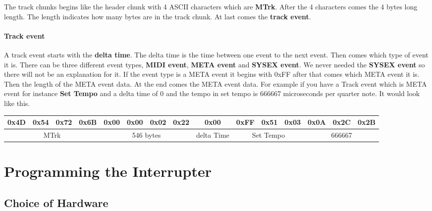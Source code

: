 The track chunks begins like the header chunk with 4 ASCII characters which are \textbf{MTrk}. After the 4 characters comes the 4 bytes long length. The length indicates how many bytes are in the track chunk. At last comes the \textbf{track event}.

\subsubsection{Track event}

A track event starts with the \textbf{delta time}. The delta time is the time between one event to the next event. Then comes which type of event it is. There can be three different event types, \textbf{MIDI event}, \textbf{META event} and \textbf{SYSEX event}. We never needed the \textbf{SYSEX event} so there will not be an explanation for it. If the event type is a META event it begins with 0xFF after that comes which META event it is. Then the length of the META event data. At the end comes the META event data. For example if you have a Track event which is META event for instance \textbf{Set Tempo} and a delta time of 0 and the tempo in set tempo is 666667 microseconds per quarter note. It would look like this.

\begin{table}
\centering
\begin{tabular}{|llll|llll|c|lll|lll|}
0x4D & 0x54 & 0x72 & 0x6B    & 0x00 & 0x00 & 0x02 & 0x22      & 0x00       & 0xFF & 0x51 & 0x03             & 0x0A & 0x2C & 0x2B           \\ 
\hline
\multicolumn{4}{|c|}{MTrk}   & \multicolumn{4}{c|}{546 bytes} & delta Time & \multicolumn{3}{c|}{Set Tempo} & \multicolumn{3}{c|}{666667} 
\end{tabular}
\end{table}

\phantom{Simon hilfe das steht nicht da wo es sein soll das ist so ein dreck}

\chapter{Programming the Interrupter}

\section{Choice of Hardware}